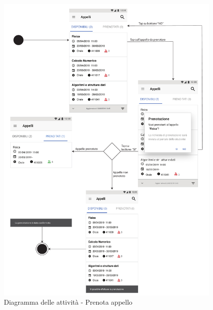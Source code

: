 \begin{figure}
	\centering
	\includegraphics[width=6in]{imgs/gruppo1/activity_diagrams/AD11_prenota_appello.pdf}
	\caption{Diagramma delle attività - Prenota appello}
	\label{diag:prenotaAppelloAD}
\end{figure}
\newpage

